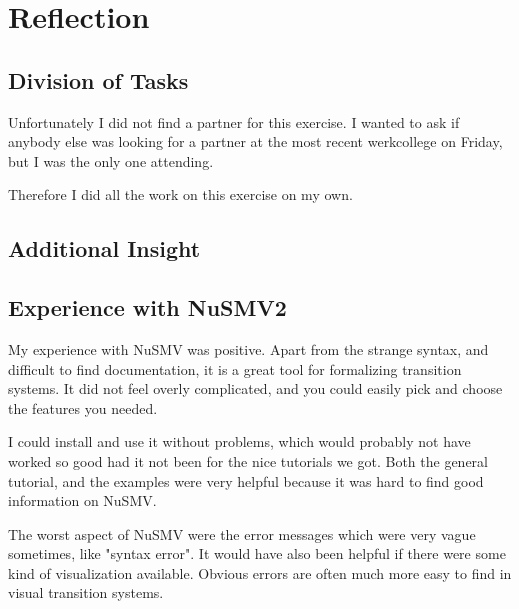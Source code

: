 \documentclass[12pt, a4paper]{article}
\begin{document}
\section{Reflection}
\subsection{Division of Tasks}
Unfortunately I did not find a partner for this exercise. I wanted to ask if anybody else was looking for a partner at the most recent werkcollege on Friday, but I was the only one attending.

Therefore I did all the work on this exercise on my own.

\subsection{Additional Insight}

\subsection{Experience with NuSMV2}
My experience with NuSMV was positive. Apart from the strange syntax, and difficult to find documentation, it is a great tool for formalizing transition systems. It did not feel overly complicated, and you could easily pick and choose the features you needed.

I could install and use it without problems, which would probably not have worked so good had it not been for the nice tutorials we got. Both the general tutorial, and the examples were very helpful because it was hard to find good information on NuSMV.

The worst aspect of NuSMV were the error messages which were very vague sometimes, like "syntax error". It would have also been helpful if there were some kind of visualization available. Obvious errors are often much more easy to find in visual transition systems.
\end{document}
